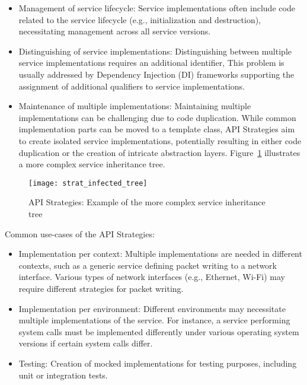 \begin{itemize}
    \item Management of service lifecycle:
    Service implementations often include code related to the service lifecycle (e.g., initialization and destruction),
    necessitating management across all service versions.
    \item Distinguishing of service implementations:
    Distinguishing between multiple service implementations requires an additional identifier,
    This problem is usually addressed by Dependency Injection (DI) frameworks supporting the assignment of additional
    qualifiers to service implementations.
    \item Maintenance of multiple implementations:
    Maintaining multiple implementations can be challenging due to code duplication.
    While common implementation parts can be moved to a template class, API Strategies aim to create isolated
    service implementations, potentially resulting in either code duplication or the creation
    of intricate abstraction layers.
    Figure~\ref{fig:strat_infected_tree} illustrates a more complex service inheritance tree.
\end{itemize}

\begin{figure}[!htb]
    \centering
    \texttt{[image: strat\_infected\_tree]}
    \caption{API Strategies: Example of the more complex service inheritance tree}
    \label{fig:strat_infected_tree}
\end{figure}

Common use-cases of the API Strategies:

\begin{itemize}
    \item Implementation per context:
    Multiple implementations are needed in different contexts, such as a generic service defining
    packet writing to a network interface.
    Various types of network interfaces (e.g., Ethernet, Wi-Fi) may require different strategies for packet writing.
    \item Implementation per environment:
    Different environments may necessitate multiple implementations of the service.
    For instance, a service performing system calls must be implemented differently under various
    operating system versions if certain system calls differ.
    \item Testing:
    Creation of mocked implementations for testing purposes, including unit or integration tests.
\end{itemize}
